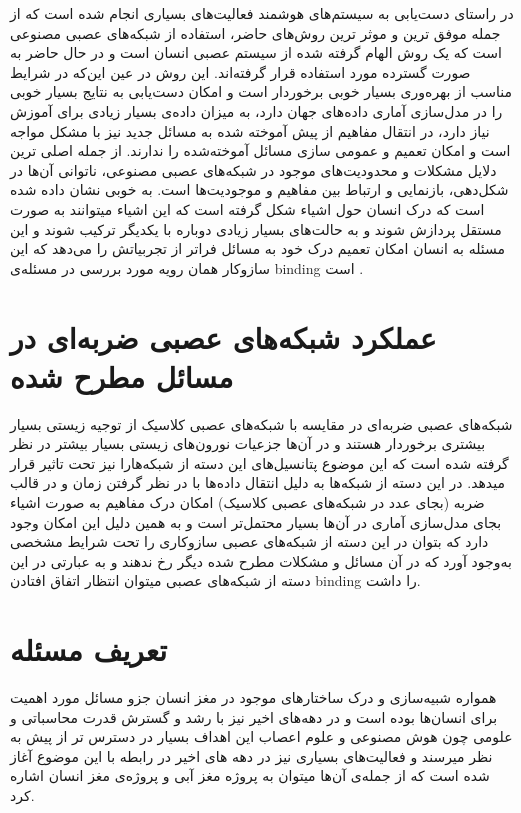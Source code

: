 \documentclass[12pt]{report}
\begin{document}
	در راستای دست‌یابی به سیستم‌های هوشمند فعالیت‌های بسیاری انجام شده است که از جمله‌ موفق ترین و موثر ترین روش‌های حاضر، استفاده از شبکه‌های عصبی مصنوعی است که یک روش الهام گرفته شده از سیستم عصبی انسان است و در حال حاضر به صورت گسترده مورد استفاده قرار گرفته‌اند. این روش در  عین این‌که در شرایط مناسب از بهره‌وری بسیار خوبی برخوردار است و امکان دست‌یابی به نتایج بسیار خوبی را در مدل‌سازی آماری داده‌های جهان دارد، به میزان داده‌ی بسیار زیادی برای آموزش نیاز دارد، در انتقال مفاهیم از پیش آموخته شده به مسائل جدید نیز با مشکل مواجه است و امکان تعمیم و عمومی سازی مسائل آموخته‌شده را ندارند.
	از جمله اصلی ترین دلایل مشکلات و محدودیت‌های موجود در شبکه‌های عصبی مصنوعی، ناتوانی آن‌ها در شکل‌دهی، بازنمایی و ارتباط بین مفاهیم و موجودیت‌ها است. به خوبی نشان داده شده است که درک انسان حول اشیاء شکل گرفته است که این اشیاء میتوانند به صورت مستقل پردازش شوند و به حالت‌های بسیار زیادی دوباره با یکدیگر ترکیب شوند و این مسئله به انسان امکان تعمیم درک خود به مسائل فراتر از تجربیاتش را می‌دهد که این ساز‌وکار همان رویه مورد بررسی در مسئله‌ی \gls{binding} است
	\cite{greff2020binding}.
	
	\section{عملکرد شبکه‌های عصبی ضربه‌ای در مسائل مطرح شده}
	شبکه‌های عصبی ضربه‌ای در مقایسه با شبکه‌های عصبی کلاسیک از توجیه زیستی بسیار بیشتری برخوردار هستند و در آن‌ها جزعیات نورون‌های زیستی بسیار بیشتر در نظر گرفته شده است که این موضوع پتانسیل‌های این دسته از شبکه‌هارا نیز تحت تاثیر قرار میدهد. در این دسته از شبکه‌ها به دلیل انتقال داده‌ها با در نظر گرفتن زمان و در قالب ضربه (بجای عدد در شبکه‌‌های عصبی کلاسیک) امکان درک مفاهیم به صورت اشیاء بجای مدل‌سازی آماری در آن‌ها بسیار محتمل‌تر است و به همین دلیل این امکان وجود دارد که بتوان در این دسته از شبکه‌های عصبی سازوکاری را تحت شرایط مشخصی به‌وجود آورد که در آن مسائل و مشکلات مطرح شده دیگر رخ ندهند و به عبارتی در این دسته از شبکه‌های عصبی میتوان انتظار اتفاق افتادن \gls{binding} را داشت.
	
	\section{تعریف مسئله}
	همواره شبیه‌سازی و درک ساختار‌های موجود در مغز انسان جزو مسائل مورد اهمیت برای انسان‌ها بوده است و در دهه‌های اخیر نیز با رشد و گسترش قدرت محاسباتی و علومی چون هوش مصنوعی و علوم اعصاب این اهداف بسیار در دسترس تر از پیش به نظر میرسند و فعالیت‌های بسیاری نیز در دهه های اخیر در رابطه با این موضوع آغاز شده است که از جمله‌ی آن‌ها میتوان به پروژه مغز آبی و پروژه‌ی مغز انسان اشاره کرد.
	
\end{document}
